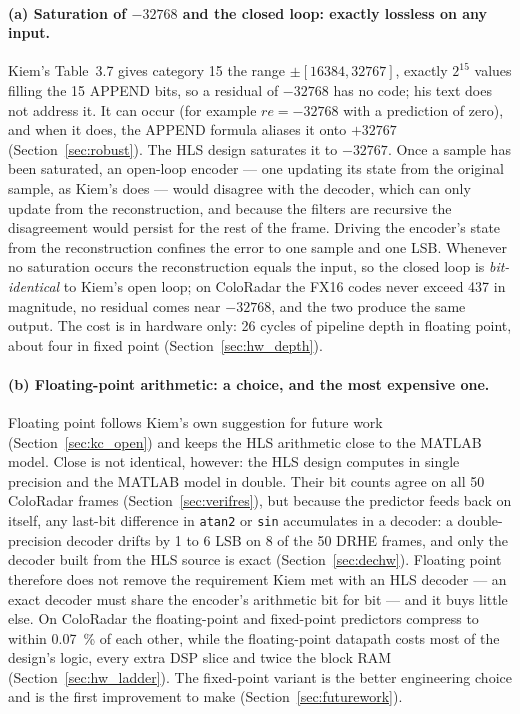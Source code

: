 \paragraph{(a) Saturation of $-32768$ and the closed loop: exactly lossless on
any input.} Kiem's Table~3.7 gives category 15 the range $\pm[16384, 32767]$,
exactly $2^{15}$ values filling the 15 APPEND bits, so a residual of $-32768$
has no code; his text does not address it. It can occur (for example
$re = -32768$ with a prediction of zero), and when it does, the APPEND formula
aliases it onto $+32767$ (Section~\ref{sec:robust}). The HLS design saturates
it to $-32767$. Once a sample has been saturated, an open-loop encoder --- one
updating its state from the original sample, as Kiem's does --- would disagree
with the decoder, which can only update from the reconstruction, and because the
filters are recursive the disagreement would persist for the rest of the frame.
Driving the encoder's state from the reconstruction confines the error to one
sample and one LSB. Whenever no saturation occurs the reconstruction equals the
input, so the closed loop is \emph{bit-identical} to Kiem's open loop; on
ColoRadar the FX16 codes never exceed 437 in magnitude, no residual comes near
$-32768$, and the two produce the same output. The cost is in hardware only:
26 cycles of pipeline depth in floating point, about four in fixed point
(Section~\ref{sec:hw_depth}).

\paragraph{(b) Floating-point arithmetic: a choice, and the most expensive one.}
Floating point follows Kiem's own suggestion for future work
(Section~\ref{sec:kc_open}) and keeps the HLS arithmetic close to the MATLAB
model. Close is not identical, however: the HLS design computes in single
precision and the MATLAB model in double. Their bit counts agree on all 50
ColoRadar frames (Section~\ref{sec:verifres}), but because the predictor feeds
back on itself, any last-bit difference in \texttt{atan2} or \texttt{sin}
accumulates in a decoder: a double-precision decoder drifts by 1 to 6 LSB on 8
of the 50 DRHE frames, and only the decoder built from the HLS source is exact
(Section~\ref{sec:dechw}). Floating point therefore does not remove the
requirement Kiem met with an HLS decoder --- an exact decoder must share the
encoder's arithmetic bit for bit --- and it buys little else. On ColoRadar the
floating-point and fixed-point predictors compress to within
\SI{0.07}{\percent} of each other, while the floating-point datapath costs most
of the design's logic, every extra DSP slice and twice the block RAM
(Section~\ref{sec:hw_ladder}). The fixed-point variant is the better
engineering choice and is the first improvement to make
(Section~\ref{sec:futurework}).

